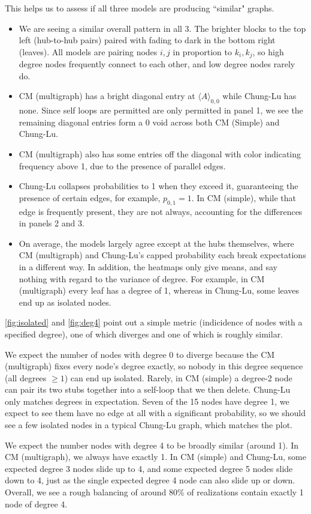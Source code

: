 \documentclass{article}
\begin{document}
\begin{enumerate}
This helps us to assess if all three models are producing ``similar" graphs. 
\begin{itemize}
    \item We are seeing a similar overall pattern in all 3. The brighter blocks to the top left (hub-to-hub pairs) paired with fading to dark in the bottom right (leaves). All models are pairing nodes $i,j$ in proportion to $k_i,k_j$, so high degree nodes frequently connect to each other, and low degree nodes rarely do. 
    \item CM (multigraph) has a bright diagonal entry at $\langle A\rangle_{0,0}$ while Chung-Lu has none. Since self loops are permitted are only permitted in panel 1, we see the remaining diagonal entries form a 0 void across both CM (Simple) and Chung-Lu. 
    \item CM (multigraph) also has some entries off the diagonal with color indicating frequency above 1, due to the presence of parallel edges. 
    \item Chung-Lu collapses probabilities to 1 when they exceed it, guaranteeing the presence of certain edges, for example, $p_{0,1}=1$. In CM (simple), while that edge is frequently present, they are not always, accounting for the differences in panels 2 and 3. 
    \item On average, the models largely agree except at the hubs themselves, where CM (multigraph) and Chung-Lu's capped probability each break expectations in a different way. In addition, the heatmaps only give means, and say nothing with regard to the variance of degree. For example, in CM (multigraph) every leaf has a degree of 1, whereas in Chung-Lu, some leaves end up as isolated nodes. 
\end{itemize}
\autoref{fig:isolated} and \autoref{fig:deg4} point out a simple metric (indicidence of nodes with a specified degree), one of which diverges and one of which is roughly similar. 

We expect the number of nodes with degree 0 to diverge because the CM (multigraph) fixes every node's degree exactly, so nobody in this degree sequence (all degrees $\geq 1$) can end up isolated. Rarely, in CM (simple) a degree-2 node can pair its two stubs together into a self-loop that we then delete. Chung-Lu only matches degrees in expectation. Seven of the 15 nodes have degree 1, we expect to see them have no edge at all with a significant probability, so we should see a few isolated nodes in a typical Chung-Lu graph, which matches the plot. 

We expect the number nodes with degree 4 to be broadly similar (around 1). In CM (multigraph), we always have exactly 1. In CM (simple) and Chung-Lu, some expected degree 3 nodes slide up to 4, and some expected degree 5 nodes slide down to 4, just as the single expected degree 4 node can also slide up or down. Overall, we see a rough balancing of around 80\% of realizations contain exactly 1 node of degree 4. 


\end{enumerate}
\clearpage
\end{document}
